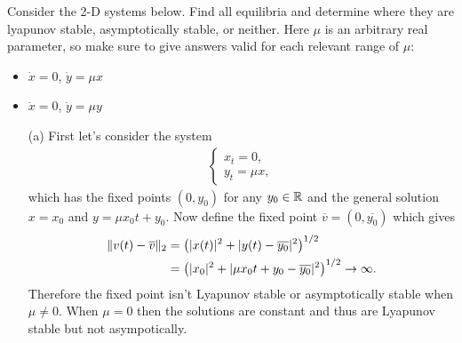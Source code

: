 \documentclass[12pt]{report}
\newcommand{\bei}{\begin{itemize}}
\newcommand{\eei}{\end{itemize}}
\begin{document}


\begin{problem}
    Consider the 2-D systems below.  Find all equilibria and determine where they are lyapunov stable, asymptotically stable, or neither.  Here $\mu$ is an arbitrary real parameter, so make sure to give answers valid for each relevant range of $\mu$:
    \bei
    \item $\dot x = 0$, $\dot y = \mu x$ 
    \item $\dot x = 0$, $\dot y = \mu y$ 
    \eei
\end{problem}

\begin{solution}

    \noindent
    \begin{enumerate}
        
        \item [(a)]
        First let's consider the system 
        \begin{align*}
            \begin{cases}
                x_t = 0,\\
                y_t = \mu x,
            \end{cases}
        \end{align*}
        which has the fixed points $(0,y_0)$ for any $y_0 \in {\mathbb R}$ and the general solution $x = x_0$ and $y = \mu x_0 t + y_0$. Now define the fixed point $\overline{v} = (0, \overline{y_0})$ which gives
        \begin{align*}
            \|v(t) - \overline{v}\|_2 &= {\left(|x(t)|^2 + |y(t) - \overline{y_0}|^2\right)}^{1/2}\\
            &= {\left(|x_0|^2 + |\mu x_0 t + y_0 - \overline{y_0}|^2\right)}^{1/2} \rightarrow \infty.
        \end{align*}
        Therefore the fixed point isn't Lyapunov stable or asymptotically stable when $\mu \neq 0 $. When $\mu = 0$ then the solutions are constant and thus are Lyapunov stable but not asympotically.  




\end{enumerate}
\end{solution}
\end{document}
